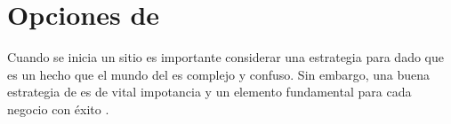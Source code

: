 
\section{ Opciones de \shipping}

Cuando se inicia un sitio \ecommerceCOM es importante considerar una estrategia para \shipping dado que es un hecho que el mundo del \shipping es complejo y confuso. Sin embargo, una buena estrategia de \shipping es de vital impotancia y un elemento fundamental para cada negocio \ecommerceCOM con éxito \cite{online_shopify_shipping_toolbox}.

